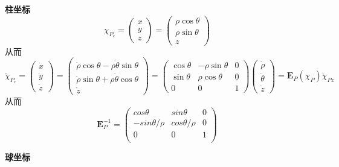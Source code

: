\documentclass[11pt]{ctexart}
\begin{document}
\noindent\textbf{柱坐标}
$$
\left.\chi_{P_c}=\left(\begin{array}{c}x\\y\\z\end{array}\right.\right)=\left(\begin{array}{c}\rho\cos\theta\\\rho\sin\theta\\z\end{array}\right)
$$
从而
$$
\dot{\chi}_{P_c}=\left(\begin{array}{c}\dot{x}\\\dot{y}\\\dot{z}\end{array}\right)=\left(\begin{array}{c}\dot{\rho}\cos\theta-\rho\dot{\theta}\sin\theta\\\dot{\rho}\sin\theta+\rho\dot{\theta}\cos\theta\\\dot{z}\end{array}\right)
=\begin{pmatrix}
    \cos\theta & -\rho\sin\theta & 0 \\
    \sin\theta & \rho\cos\theta & 0 \\
    0 & 0 & 1
    \end{pmatrix}\left(\begin{array}{c}\dot{\rho}\\\dot{\theta}\\\dot{z}\end{array}\right)=\mathbf{E}_{P}\left(\chi_{P}\right)
    \dot{\chi}_{Pz}
$$
从而
$$
\mathbf{E}_{P}^{-1}=
\begin{pmatrix}
    cos\theta & sin\theta & 0 \\
    -sin\theta/\rho & cos\theta/\rho & 0 \\
    0 & 0 & 1 \\
\end{pmatrix}
$$

\noindent\textbf{球坐标}
\end{document}
